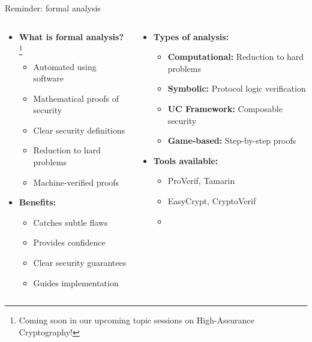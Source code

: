 \documentclass[aspectratio=169, lualatex, handout]{beamer}
\begin{document}
\begin{frame}{Reminder: formal analysis}
	\begin{columns}[c]
		\begin{column}{0.5\textwidth}
			\begin{itemize}
				\item \textbf{What is formal analysis?}\footnote{Coming soon in our upcoming topic sessions on High-Assurance Cryptography!}
				      \begin{itemize}
					      \item Automated using software
					      \item Mathematical proofs of security
					      \item Clear security definitions
					      \item Reduction to hard problems
					      \item Machine-verified proofs
				      \end{itemize}
				\item \textbf{Benefits:}
				      \begin{itemize}
					      \item Catches subtle flaws
					      \item Provides confidence
					      \item Clear security guarantees
					      \item Guides implementation
				      \end{itemize}
			\end{itemize}
		\end{column}
		\begin{column}{0.5\textwidth}
			\begin{itemize}
				\item \textbf{Types of analysis:}
				      \begin{itemize}
					      \item \textbf{Computational:} Reduction to hard problems
					      \item \textbf{Symbolic:} Protocol logic verification
					      \item \textbf{UC Framework:} Composable security
					      \item \textbf{Game-based:} Step-by-step proofs
				      \end{itemize}
				\item \textbf{Tools available:}
				      \begin{itemize}
					      \item ProVerif, Tamarin
					      \item EasyCrypt, CryptoVerif
					      \item \fstar
				      \end{itemize}
			\end{itemize}
		\end{column}
	\end{columns}
\end{frame}
\end{document}
